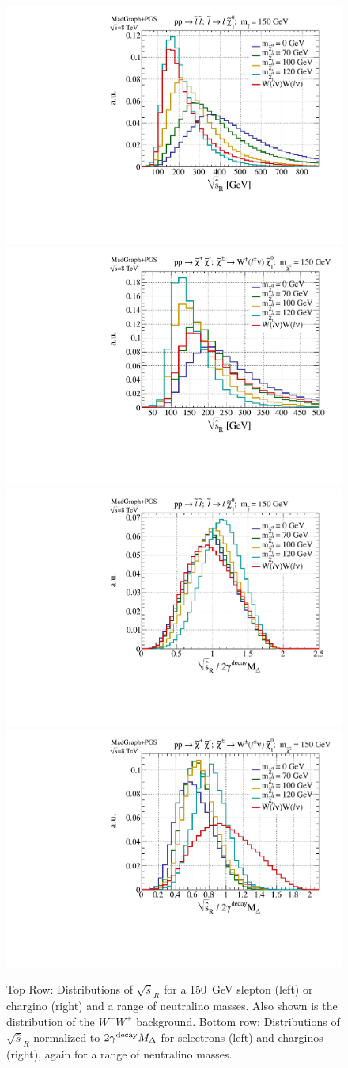 \begin{figure}[ht]
\includegraphics[width=0.35\columnwidth]{fig/sectionII/shat_1D_slepton.pdf}
\includegraphics[width=0.35\columnwidth]{fig/sectionII/shat_1D_chargino.pdf}
\includegraphics[width=0.35\columnwidth]{fig/sectionII/shat_norm_1D_slepton.pdf}
\includegraphics[width=0.35\columnwidth]{fig/sectionII/shat_norm_1D_chargino.pdf}
\caption{Top Row: Distributions of $\sqrt{\hat{s}}_R$ for a 150~GeV slepton (left) or chargino (right) and a range of neutralino masses. Also shown is the distribution of the $W^-W^+$ background.  Bottom row: Distributions of $\sqrt{\hat{s}}_R$ normalized to $2 \gamma^{\rm decay} M_\Delta$ for selectrons (left) and charginos (right), again for a range of neutralino masses. \label{fig:compare_hats}}
\end{figure}

